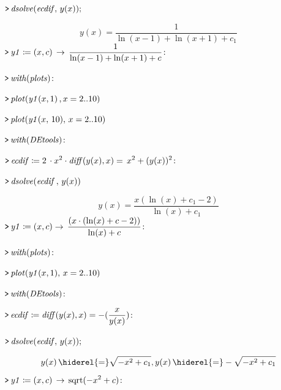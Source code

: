 \documentclass{article}
\begin{document}
\mapleinput
{$ \displaystyle \texttt{>\,} \mathit{dsolve} (\mathit{ecdif} ,\,y (x)); $}

\begin{dmath}\label{(2)}
y \! \left(x \right)=\frac{1}{\ln \! \left(x -1\right)+\ln \! \left(x +1\right)+c_{1}}
\end{dmath}
\mapleinput
{$ \displaystyle \texttt{>\,} \mathit{y1} \coloneqq (x ,c)\,\rightarrow \,\frac{1}{\ln (x -1)+\ln (x +1)+c}\colon  $}

\mapleinput
{$ \displaystyle \texttt{>\,} \mathit{with} (\mathit{plots})\colon  $}

\mapleinput
{$ \displaystyle \texttt{>\,} \mathit{plot} (\mathit{y1} (x ,1)\,,x =2..10) $}

{}
\mapleinput
{$ \displaystyle \texttt{>\,} \mathit{plot} (\mathit{y1} (x ,\,10),\,x =2..10) $}

{}
\mapleinput
{$ \displaystyle \texttt{>\,} \mathit{with} (\mathit{DEtools})\colon  $}

\mapleinput
{$ \displaystyle \texttt{>\,} \mathit{ecdif} \coloneqq 2\,\cdot x^{2}\cdot \mathit{diff} (y (x),x)=\,x^{2}+(y (x))^{2}\colon  $}

\mapleinput
{$ \displaystyle \texttt{>\,} \mathit{dsolve} (\mathit{ecdif} \,,\,y (x)) $}

\begin{dmath}\label{(3)}
y \! \left(x \right)=\frac{x \left(\ln \! \left(x \right)+c_{1}-2\right)}{\ln \! \left(x \right)+c_{1}}
\end{dmath}
\mapleinput
{$ \displaystyle \texttt{>\,} \mathit{y1} \coloneqq (x ,c)\rightarrow \,\frac{(x \cdot (\ln (x)+c -2))}{\ln (x)+c}\colon  $}

\mapleinput
{$ \displaystyle \texttt{>\,} \mathit{with} (\mathit{plots})\colon  $}

\mapleinput
{$ \displaystyle \texttt{>\,} \mathit{plot} (\mathit{y1} (x ,1),\,x =2..10) $}

{}
\mapleinput
{$ \displaystyle \texttt{>\,} \mathit{with} (\mathit{DEtools})\colon  $}

\mapleinput
{$ \displaystyle \texttt{>\,} \mathit{ecdif} \coloneqq \mathit{diff} (y (x),x)=-(\frac{x}{y (x)})\colon  $}

\mapleinput
{$ \displaystyle \texttt{>\,} \mathit{dsolve} (\mathit{ecdif} ,\,y (x)); $}

\begin{dmath}\label{(4)}
y \! \left(x \right) \hiderel{=} \sqrt{-x^{2}+c_{1}},y \! \left(x \right) \hiderel{=} -\sqrt{-x^{2}+c_{1}}
\end{dmath}
\mapleinput
{$ \displaystyle \texttt{>\,} \mathit{y1} \coloneqq (x ,c)\,\rightarrow \,\mathrm{sqrt}(-x^{2}+c)\colon  $}
\end{document}
